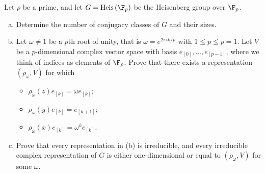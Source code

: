 \documentclass[10pt]{mypackage}
\begin{document}
\begin{problem}[Problem 2]
  Let $p$ be a prime, and let $G = \operatorname{Heis}\left( \F_p \right)$ be the Heisenberg group over $\F_p$.
  \begin{enumerate}[(a)]
    \item Determine the number of conjugacy classes of $G$ and their sizes.
    \item Let $\omega\neq 1$ be a $p$th root of unity, that is $\omega = e^{2\pi i k/p}$ with $1\leq p \leq p=1$. Let $V$ be a $p$-dimensional complex vector space with basis $e_{[0]},\dots,e_{[p-1]}$, where we think of indices as elements of $\F_p$. Prove that there exists a representation $\left( \rho_{\omega},V \right)$ for which
      \begin{itemize}
        \item $\rho_{\omega}(z)e_{[k]} = \omega e_{[k]}$;
        \item $\rho_{\omega}(y)e_{[k]} = e_{[k+1]}$;
        \item $\rho_{\omega}(x)e_{[k]} = \omega^{k}e_{[k]}$.
      \end{itemize}
    \item Prove that every representation in (b) is irreducible, and every irreducible complex representation of $G$ is either one-dimensional or equal to $\left( \rho_{\omega},V \right)$ for some $\omega$.
  \end{enumerate}
\end{problem}
\end{document}
